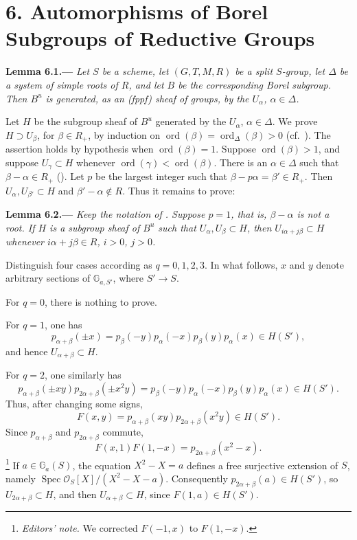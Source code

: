 \section*{6. Automorphisms of Borel Subgroups of Reductive Groups}

\par\medskip\noindent{}\textbf{Lemma 6.1.---}\enspace
\emph{Let \(S\) be a scheme, let \((G,T,M,R)\) be a split \(S\)-group,
let \(\Delta\) be a system of simple roots of \(R\), and let \(B\) be
the corresponding Borel subgroup.  Then \(B^u\) is generated, as an
\textup{(fppf)} sheaf of groups, by the \(U_\alpha\),
\(\alpha\in\Delta\).}

Let \(H\) be the subgroup sheaf of \(B^u\) generated by the
\(U_\alpha\), \(\alpha\in\Delta\).  We prove
\(H\supset U_\beta\), for \(\beta\in R_+\), by induction on
\(\operatorname{ord}(\beta)=\operatorname{ord}_\Delta(\beta)>0\)
(cf.\ ).  The assertion holds by hypothesis when
\(\operatorname{ord}(\beta)=1\).  Suppose
\(\operatorname{ord}(\beta)>1\), and suppose
\(U_\gamma\subset H\) whenever
\(\operatorname{ord}(\gamma)<\operatorname{ord}(\beta)\).  There is an
\(\alpha\in\Delta\) such that \(\beta-\alpha\in R_+\)
().  Let \(p\) be the largest integer such that
\(\beta-p\alpha=\beta'\in R_+\).  Then
\(U_\alpha,U_{\beta'}\subset H\) and \(\beta'-\alpha\notin R\).
Thus it remains to prove:

\par\medskip\noindent{}\textbf{Lemma 6.2.---}\enspace
\emph{Keep the notation of .  Suppose \(p=1\), that is,
\(\beta-\alpha\) is not a root.  If \(H\) is a subgroup sheaf of
\(B^u\) such that \(U_\alpha,U_\beta\subset H\), then
\(U_{i\alpha+j\beta}\subset H\) whenever
\(i\alpha+j\beta\in R\), \(i>0\), \(j>0\).}

Distinguish four cases according as \(q=0,1,2,3\).  In what follows,
\(x\) and \(y\) denote arbitrary sections of
\(\mathbb G_{a,S'}\), where \(S'\to S\).

For \(q=0\), there is nothing to prove.

For \(q=1\), one has
\[
 p_{\alpha+\beta}(\pm x)
 =p_\beta(-y)p_\alpha(-x)p_\beta(y)p_\alpha(x)\in H(S'),
\]
and hence \(U_{\alpha+\beta}\subset H\).

For \(q=2\), one similarly has
\[
 p_{\alpha+\beta}(\pm xy)
 p_{2\alpha+\beta}(\pm x^2y)
 =p_\beta(-y)p_\alpha(-x)p_\beta(y)p_\alpha(x)\in H(S').
\]
Thus, after changing some signs,
\[
 F(x,y)=p_{\alpha+\beta}(xy)p_{2\alpha+\beta}(x^2y)\in H(S').
\]
Since \(p_{\alpha+\beta}\) and \(p_{2\alpha+\beta}\) commute,
\[
 F(x,1)F(1,-x)=p_{2\alpha+\beta}(x^2-x).
\]
\setcounter{footnote}{27}
\footnote{\textit{Editors' note.} We corrected \(F(-1,x)\) to
\(F(1,-x)\).}
If \(a\in\mathbb G_a(S)\), the equation \(X^2-X=a\) defines a free
surjective extension of \(S\), namely
\(\operatorname{Spec}\mathcal O_S[X]/(X^2-X-a)\).  Consequently
\(p_{2\alpha+\beta}(a)\in H(S')\), so
\(U_{2\alpha+\beta}\subset H\), and then
\(U_{\alpha+\beta}\subset H\), since \(F(1,a)\in H(S')\).

